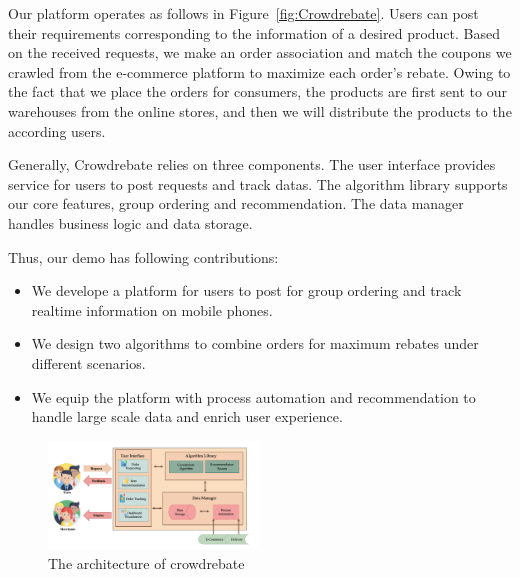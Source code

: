 Our platform operates as follows in Figure~\ref{fig:Crowdrebate}. Users can post their requirements corresponding to the information of a desired product. Based on the received requests, we make an order association and match the coupons we crawled from the e-commerce platform to maximize each order's rebate. Owing to the fact that we place the orders for consumers, the products are first sent to our warehouses from the online stores, and then we will distribute the products to the according users.

Generally, Crowdrebate relies on three components. The user interface provides service for users to post requests and track datas. The algorithm library supports our core features, group ordering and recommendation. The data manager handles business logic and data storage.

Thus, our demo has following contributions:
\begin{itemize}
	\item We develope a platform for users to post for group ordering and track realtime information on mobile phones.
	\item We design two algorithms to combine orders for maximum rebates under different scenarios.
	\item We equip the platform with process automation and recommendation to handle large scale data and enrich user experience.
\end{itemize}
\begin{figure}[t] 
	\centering %
	\includegraphics[width=0.5\textwidth]{../figure/ar.png} %
	\caption{The architecture of crowdrebate} %
	\label{fig:ar} %
\end{figure}

